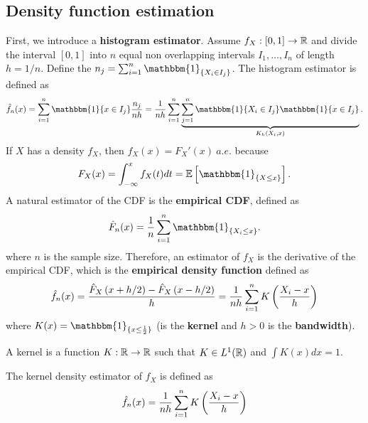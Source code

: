 \subsection{Density function estimation}
First, we introduce a \textbf{histogram estimator}. Assume $f_X:\left[0,1\right]\to
    \mathbb{R}$ and divide the interval $[0,1]$ into $n$ equal non overlapping intervals
$I_1,\ldots,I_n$ of length $h=1/n$. Define the $n_j=\sum_{i=1}^n
    \mathbbm{1}_{\{X_i\in I_j\}}$. The histogram estimator is defined as \begin{equation*}
    \hat{f}_n(x)=\sum_{i=1}^n \mathbbm{1}\{x \in I_j\}\frac{n_j}{nh} = \frac{1}{nh}\sum_{i=1}^n \underbrace{\sum_{j=1}^n \mathbbm{1}\{X_i\in I_j\}\mathbbm{1}\{x\in I_j\}}_{K_h\pa{X_i,x}}.
\end{equation*}
If $X$ has a density $f_X$, then $f_X(x)=F_X'(x)\ a.e.$ because \begin{equation*}
    F_X(x)=\int_{-\infty}^x f_X(t)dt=\E\bra{\mathbbm{1}_{\{X\le x\}}}.
\end{equation*}
A natural estimator of the CDF is the  \textbf{empirical CDF}, defined as
\begin{equation*}
    \hat{F}_n(x)=\frac{1}{n}\sum_{i=1}^n \mathbbm{1}_{\{X_i\le x\}}.
\end{equation*} where $n$ is the sample size. Therefore, an estimator of $f_X$ is the derivative of the empirical CDF, which is the \textbf{empirical density function} defined as \begin{equation*}
    \begin{split}
        \hat{f}_n(x)=\frac{\hat{F}_X\left(x+h/2\right)-\hat{F}_X\left(x-h/2\right)}{h}= \frac{1}{nh}\sum_{i=1}^n K\left(\frac{X_i-x}{h}\right)
    \end{split}
\end{equation*} where $K(x)=\mathbbm{1}_{\{x\le \frac{1}{2}\}}$ (is the \textbf{kernel} and $h>0$ is the \textbf{bandwidth}).
\begin{definition}
    A kernel is a function $K:\mathbb{R}\to \mathbb{R}$ such that $K\in L^1(\mathbb{R})$ and $\int K(x)dx=1$.
\end{definition}
\begin{definition}
    The kernel density estimator of $f_X$ is defined as \begin{equation*}
        \hat{f}_n(x)=\frac{1}{nh}\sum_{i=1}^n K\left(\frac{X_i-x}{h}\right)
    \end{equation*}
\end{definition}
